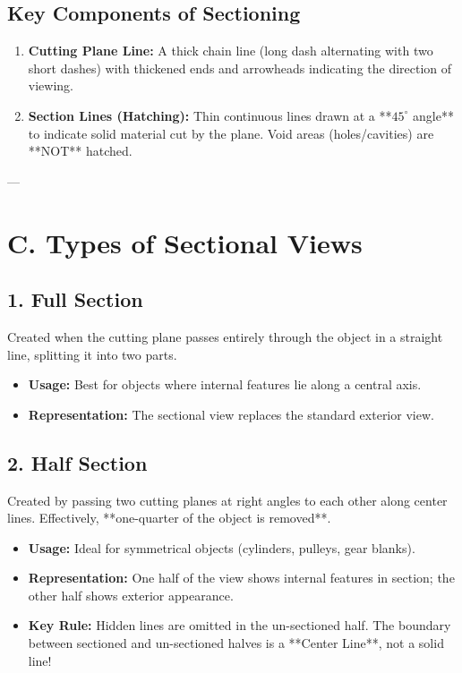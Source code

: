 \subsection{Key Components of Sectioning}
\begin{enumerate}
    \item \textbf{Cutting Plane Line:} A thick chain line (long dash alternating with two short dashes) with thickened ends and arrowheads indicating the direction of viewing.
    \item \textbf{Section Lines (Hatching):} Thin continuous lines drawn at a **$45^\circ$ angle** to indicate solid material cut by the plane. Void areas (holes/cavities) are **NOT** hatched.
\end{enumerate}

---

\section{C. Types of Sectional Views}

\subsection{1. Full Section}
Created when the cutting plane passes entirely through the object in a straight line, splitting it into two parts.
\begin{itemize}
    \item \textbf{Usage:} Best for objects where internal features lie along a central axis.
    \item \textbf{Representation:} The sectional view replaces the standard exterior view.
\end{itemize}

\subsection{2. Half Section}
Created by passing two cutting planes at right angles to each other along center lines. Effectively, **one-quarter of the object is removed**.
\begin{itemize}
    \item \textbf{Usage:} Ideal for symmetrical objects (cylinders, pulleys, gear blanks).
    \item \textbf{Representation:} One half of the view shows internal features in section; the other half shows exterior appearance.
    \item \textbf{Key Rule:} Hidden lines are omitted in the un-sectioned half. The boundary between sectioned and un-sectioned halves is a **Center Line**, not a solid line!
\end{itemize}

